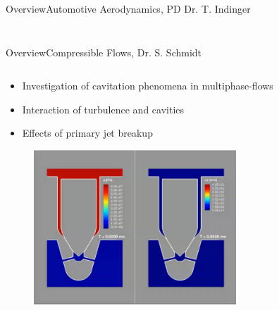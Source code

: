 \documentclass[AERbeamer%
              ,optEnglish%
              ,optBiber%
              ,optBibstyleAlphabetic%
              ,optBeamerClassicFormat%
              ]{AERlatex}%
\begin{document}
\begin{frame}[c]{Overview}{Automotive Aerodynamics, PD Dr. T. Indinger}
\begin{columns}[T]
\begin{column}{0.48\textwidth}
\begin{figure}
            \end{figure}
        \end{column}
    \end{columns}
\end{frame}


\begin{frame}[c]{Overview}{Compressible Flows, Dr. S. Schmidt}
    \centering
    \begin{columns}[T]
        \begin{column}{0.48\textwidth}
            \begin{itemize}
                \item Investigation of cavitation phenomena in multiphase-flows
                \item Interaction of turbulence and cavities
                \item Effects of primary jet breakup
            \end{itemize}
            \begin{figure}
                \centering
                \includegraphics[width=0.8\textwidth]{Steffen1.png}
            \end{figure}
        \end{column}
        \begin{column}{0.48\textwidth}
            \centering
            \begin{figure}
                \centering

\end{figure}
\end{column}
\end{columns}
\end{frame}
\end{document}
